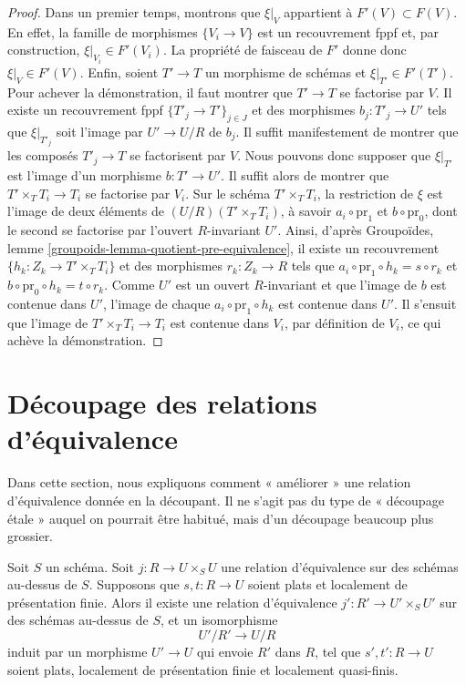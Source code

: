 \begin{proof}
\medskip\noindent
Dans un premier temps, montrons que $\xi|_V$ appartient à $F'(V) \subset F(V)$.
En effet, la famille de morphismes $\{V_i \to V\}$ est un recouvrement fppf
et, par construction, $\xi|_{V_i} \in F'(V_i)$.
La propriété de faisceau de $F'$ donne donc $\xi|_V \in F'(V)$.
Enfin, soient $T' \to T$ un morphisme de schémas et
$\xi|_{T'} \in F'(T')$. Pour achever la démonstration, il faut montrer que
$T' \to T$ se factorise par $V$.
Il existe un recouvrement fppf $\{T'_j \to T'\}_{j \in J}$ et des morphismes
$b_j : T'_j \to U'$ tels que $\xi|_{T'_j}$ soit l'image par
$U' \to U/R$ de $b_j$. Il suffit manifestement de montrer que les composés
$T'_j \to T$ se factorisent par $V$. Nous pouvons donc supposer que $\xi|_{T'}$
est l'image d'un morphisme $b : T' \to U'$. Il suffit alors de montrer
que $T'\times_T T_i \to T_i$ se factorise par $V_i$. Sur le schéma
$T' \times_T T_i$, la restriction de $\xi$ est l'image de deux
éléments de $(U/R)(T' \times_T T_i)$, à savoir $a_i \circ \text{pr}_1$ et
$b \circ \text{pr}_0$, dont le second se factorise par l'ouvert $R$-invariant
$U'$. Ainsi, d'après
Groupoïdes, lemme \ref{groupoids-lemma-quotient-pre-equivalence},
il existe un recouvrement $\{h_k : Z_k \to T' \times_T T_i\}$ et des morphismes
$r_k : Z_k \to R$ tels que $a_i \circ \text{pr}_1 \circ h_k = s \circ r_k$
et $b \circ \text{pr}_0 \circ h_k = t \circ r_k$. Comme $U'$ est un ouvert
$R$-invariant et que l'image de $b$ est contenue dans $U'$, l'image de chaque
$a_i \circ \text{pr}_1 \circ h_k$ est contenue dans $U'$. Il s'ensuit que
l'image de $T' \times_T T_i \to T_i$ est contenue dans $V_i$, par définition de $V_i$,
ce qui achève la démonstration.
\end{proof}












\section{Découpage des relations d'équivalence}
\label{section-slicing}

\noindent
Dans cette section, nous expliquons comment « améliorer » une relation
d'équivalence donnée en la découpant. Il ne s'agit pas du type de « découpage
étale » auquel on pourrait être habitué, mais d'un découpage beaucoup plus grossier.


\begin{lemma}
\label{lemma-slice-equivalence-relation}
Soit $S$ un schéma.
Soit $j : R \to U \times_S U$ une relation d'équivalence sur des schémas au-dessus de $S$.
Supposons que $s, t : R \to U$ soient plats et localement de présentation finie.
Alors il existe une relation d'équivalence $j' : R' \to U'\times_S U'$
sur des schémas au-dessus de $S$, et un isomorphisme
$$
U'/R' \longrightarrow U/R
$$
induit par un morphisme $U' \to U$ qui envoie $R'$ dans $R$, tel que
$s', t' : R \to U$ soient plats, localement de présentation finie
et localement quasi-finis.
\end{lemma}

